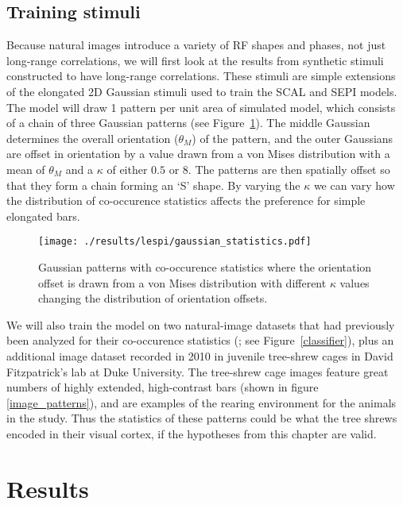 \subsection{Training stimuli}
\label{synthetic}

Because natural images introduce a variety of RF shapes and phases,
not just long-range correlations, we will first look at the results
from synthetic stimuli constructed to have long-range correlations.
These stimuli are simple extensions of the
elongated 2D Gaussian stimuli used to train the SCAL and SEPI models.
The model will draw 1 pattern per unit area of simulated model, which consists of
a chain of three Gaussian patterns (see
Figure~\ref{GaussianStatistics}). The middle Gaussian determines the
overall orientation ($\theta_M$) of the pattern, and the outer
Gaussians are offset in orientation by a value drawn from a von Mises
distribution with a mean of $\theta_M$ and a $\kappa$ of either $0.5$
or $8$. The patterns are then spatially offset so that they form a
chain forming an `S' shape. By varying the $\kappa$ we can vary how
the distribution of co-occurence statistics affects the preference
for simple elongated bars.

\begin{figure}
	\centering
	\texttt{[image: ./results/lespi/gaussian\_statistics.pdf]}
	\caption[Example of Gaussian patterns with co-occurence
      statistics] {Gaussian patterns with co-occurence statistics
      where the orientation offset is drawn from a von Mises
      distribution with different $\kappa$ values changing the
      distribution of orientation offsets.}
    \label{GaussianStatistics}
\end{figure}

We will also train the model on two natural-image datasets that had
previously been analyzed for their co-occurence statistics
(\citealt{Perrinet2015}; see Figure~\ref{classifier}), plus an
additional image dataset recorded in 2010 in juvenile tree-shrew cages
in David Fitzpatrick's lab at Duke University.  The tree-shrew cage
images feature great numbers of highly extended, high-contrast bars
(shown in figure \ref{image_patterns}), and are examples of the
rearing environment for the animals in the \cite{Bosking1997} study.
Thus the statistics of these patterns could be what the
\cite{Bosking1997} tree shrews encoded in their visual cortex, if the
hypotheses from this chapter are valid.

\section{Results}

